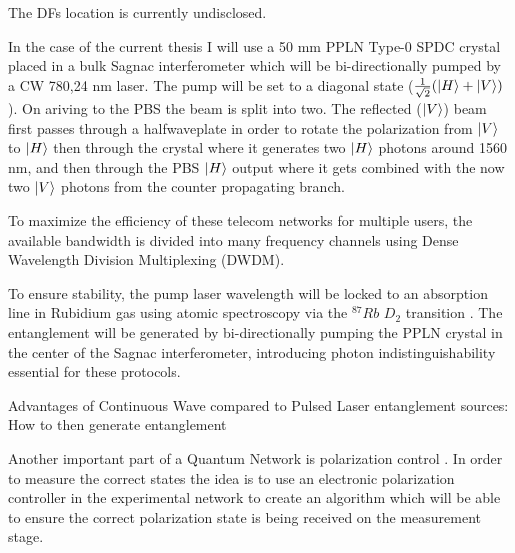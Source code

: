 \documentclass{article}
\theoremstyle{mytheoremstyle}
\theoremstyle{mytheoremstyle}
\theoremstyle{myproblemstyle}
\begin{document}
The DFs location is currently undisclosed.

In the case of the current thesis I will use a 50 mm PPLN Type-0 SPDC crystal placed in a bulk Sagnac interferometer which will be bi-directionally
pumped by a CW 780,24 nm laser. The pump will be set to a diagonal state ($\frac{1}{\sqrt{2}}(\ket{H} + \ket{V})$). On ariving to the
PBS the beam is split into two. The reflected ($\ket{V}$) beam first passes through a halfwaveplate in order to rotate the polarization from $\ket{V}$ to $\ket{H}$
then through the crystal where it generates two $\ket{H}$ photons around 1560 nm, and then through the PBS $\ket{H}$ output where it gets combined
with the now two $\ket{V}$ photons from the counter propagating branch.

To maximize the efficiency of these telecom networks for multiple users,
the available bandwidth is divided into many frequency channels using Dense Wavelength Division Multiplexing (DWDM).

To ensure stability, the pump laser wavelength will be locked to an absorption line in Rubidium gas using atomic spectroscopy via the $^{87}Rb$ $D_2$ transition \cite{metger2017sas}.
The entanglement will be generated by bi-directionally pumping the PPLN crystal in the center of the Sagnac interferometer,
introducing photon indistinguishability essential for these protocols.

Advantages of Continuous Wave compared to Pulsed Laser entanglement sources:
How to then generate entanglement

Another important part of a Quantum Network is polarization control \cite{CCSHDCDRS}. In order to measure the correct states the
idea is to use an electronic polarization controller in the experimental network to create an algorithm which will be able to
ensure the correct polarization state is being received on the measurement stage.
\end{document}
